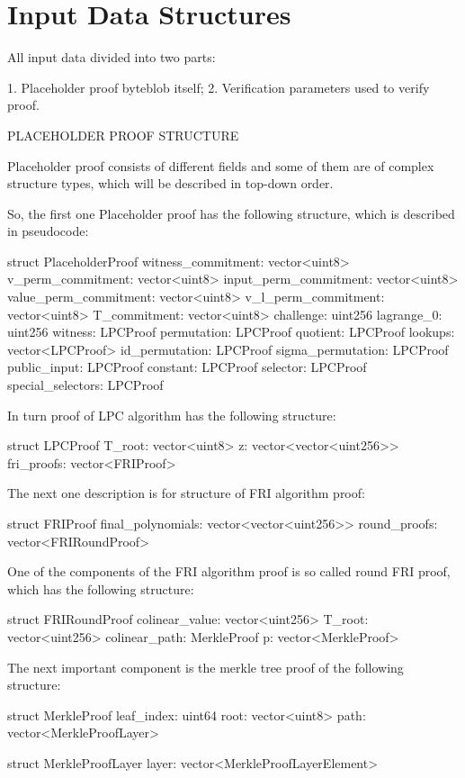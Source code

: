 \section{Input Data Structures}

All input data divided into two parts:

1. Placeholder proof byteblob itself;
2. Verification parameters used to verify proof.

PLACEHOLDER PROOF STRUCTURE

Placeholder proof consists of different fields and some of them are of complex structure types, which will be described in top-down order.

So, the first one Placeholder proof has the following structure, which is described in pseudocode:

struct PlaceholderProof {
    witness_commitment: vector<uint8>
    v_perm_commitment: vector<uint8>
    input_perm_commitment: vector<uint8>
    value_perm_commitment: vector<uint8>
    v_l_perm_commitment: vector<uint8>
    T_commitment: vector<uint8>
    challenge: uint256
    lagrange_0: uint256
    witness: LPCProof
    permutation: LPCProof
    quotient: LPCProof
    lookups: vector<LPCProof>
    id_permutation: LPCProof
    sigma_permutation: LPCProof
    public_input: LPCProof
    constant: LPCProof
    selector: LPCProof
    special_selectors: LPCProof
}

In turn proof of LPC algorithm has the following structure:

struct LPCProof {
    T_root: vector<uint8>
    z: vector<vector<uint256>>
    fri_proofs: vector<FRIProof>
}

The next one description is for structure of FRI algorithm proof:

struct FRIProof {
    final_polynomials: vector<vector<uint256>>
    round_proofs: vector<FRIRoundProof>
}

One of the components of the FRI algorithm proof is so called round FRI proof, which has the following structure:

struct FRIRoundProof {
    colinear_value: vector<uint256>
    T_root: vector<uint256>
    colinear_path: MerkleProof
    p: vector<MerkleProof>
}

The next important component is the merkle tree proof of the following structure:

struct MerkleProof {
    leaf_index: uint64
    root: vector<uint8>
    path: vector<MerkleProofLayer>
}

struct MerkleProofLayer {
    layer: vector<MerkleProofLayerElement>
}


